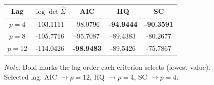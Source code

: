 \begin{table}[htpb]
    \centering
    \scriptsize
    \begin{tabular}{ccccc}
    \toprule
    \textbf{Lag} & \textbf{$\log\det\hat{\Sigma}$} & \textbf{AIC} & \textbf{HQ} & \textbf{SC} \\
    \midrule
    $p = 4$ & -103.1111 & -98.0796 & \textbf{-94.9444} & \textbf{-90.3591} \\
    $p = 8$ & -105.7716 & -95.7087 & -89.4383 & -80.2677 \\
    $p = 12$ & -114.0426 & \textbf{-98.9483} & -89.5426 & -75.7867 \\
    \bottomrule
    \end{tabular}

    \vspace{0.15cm}
    \raggedright
    \tiny{\textit{Note:} Bold marks the lag order each criterion selects (lowest value).
    \\ Selected lag: AIC $\to p=12$, HQ $\to p=4$, SC $\to p=4$.}
\end{table}
